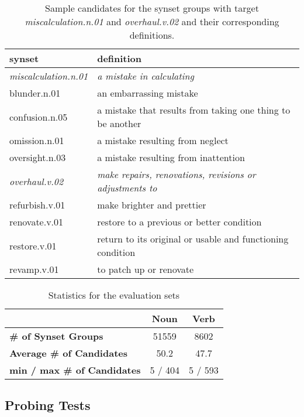 \documentclass[11pt,a4paper]{article}
\begin{document}
\begin{table*}
    \centering
    \begin{tabular}{l|l}
    \hline
    \textbf{synset} & \textbf{definition} \\ \hline
     \emph{miscalculation.n.01} & \emph{a mistake in calculating} \\
     blunder.n.01 & an embarrassing mistake \\
     confusion.n.05 & a mistake that results from taking one thing to be another \\
     omission.n.01 & a mistake resulting from neglect \\
     oversight.n.03 & a mistake resulting from inattention \\ \hline
     \emph{overhaul.v.02} & \emph{make repairs, renovations, revisions or adjustments to} \\
     refurbish.v.01 & make brighter and prettier \\
     renovate.v.01 & restore to a previous or better condition \\
     restore.v.01 & return to its original or usable and functioning condition \\
     revamp.v.01 & to patch up or renovate \\ \hline

    \end{tabular}
    \caption{Sample candidates for the synset groups with target \emph{miscalculation.n.01} and \emph{overhaul.v.02} and their corresponding definitions.} 
    \label{tab:dataset_samples}
\end{table*}

\begin{table}
    \centering
    \begin{tabular}{l|cc}
    \hline
         & \textbf{Noun} & \textbf{Verb} \\ \hline
         \textbf{\# of Synset Groups} & 51559 & 8602 \\
         \textbf{Average \# of Candidates} & 50.2 & 47.7 \\
         \textbf{min / max \# of Candidates} & 5 / 404 & 5 / 593 \\ \hline
    \end{tabular}
    \caption{Statistics for the evaluation sets}
    \label{tab:dataset_stats}
\end{table}

\subsection{Probing Tests}
\end{document}
